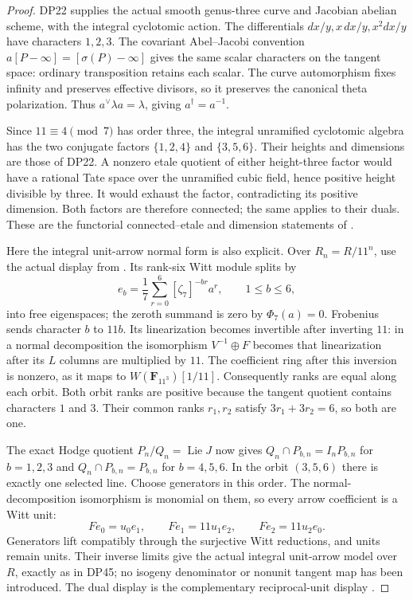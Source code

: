 \begin{proof}
DP22 supplies the actual smooth genus-three curve and Jacobian abelian scheme, with the integral cyclotomic action.
The differentials $dx/y,x\,dx/y,x^2dx/y$ have characters $1,2,3$.
The covariant Abel--Jacobi convention
$a[P-\infty]=[\sigma(P)-\infty]$ gives the same scalar characters on the tangent space: ordinary transposition retains each scalar.
The curve automorphism fixes infinity and preserves effective divisors, so it preserves the canonical theta polarization.
Thus $a^\vee\lambda a=\lambda$, giving $a^\dagger=a^{-1}$.

Since $11\equiv4\pmod7$ has order three, the integral unramified cyclotomic algebra has the two conjugate factors
$\{1,2,4\}$ and $\{3,5,6\}$.
Their heights and dimensions are those of DP22.
A nonzero etale quotient of either height-three factor would have a rational Tate space over the unramified cubic field, hence positive height divisible by three.
It would exhaust the factor, contradicting its positive dimension.
Both factors are therefore connected; the same applies to their duals.
These are the functorial connected--etale and dimension statements of
\cite[\S2.2, (4); \S2.3, Proposition 3]{Tate67}.

Here the integral unit-arrow normal form is also explicit.
Over $R_n=R/11^n$, use the actual display from
\cite[Theorems 5 and 9, pp.~131--132]{Zink}.
Its rank-six Witt module splits by
\[
 e_b=\frac17\sum_{r=0}^6[\zeta_7]^{-br}a^r,\qquad 1\le b\le6,
\]
into free eigenspaces; the zeroth summand is zero by $\Phi_7(a)=0$.
Frobenius sends character $b$ to $11b$.
Its linearization becomes invertible after inverting $11$:
in a normal decomposition the isomorphism $V^{-1}\oplus F$ becomes that linearization after its $L$ columns are multiplied by $11$.
The coefficient ring after this inversion is nonzero, as it maps to
$W(\mathbf F_{11^3})[1/11]$.
Consequently ranks are equal along each orbit.
Both orbit ranks are positive because the tangent quotient contains characters $1$ and $3$.
Their common ranks $r_1,r_2$ satisfy $3r_1+3r_2=6$, so both are one.

The exact Hodge quotient $P_n/Q_n=\operatorname{Lie}J$ now gives
$Q_n\cap P_{b,n}=I_nP_{b,n}$ for $b=1,2,3$ and
$Q_n\cap P_{b,n}=P_{b,n}$ for $b=4,5,6$.
In the orbit $(3,5,6)$ there is exactly one selected line.
Choose generators in this order.
The normal-decomposition isomorphism is monomial on them, so every arrow coefficient is a Witt unit:
\[
 Fe_0=u_0e_1,\qquad Fe_1=11u_1e_2,\qquad
 Fe_2=11u_2e_0 .
\]
Generators lift compatibly through the surjective Witt reductions, and units remain units.
Their inverse limits give the actual integral unit-arrow model over $R$, exactly as in DP45; no isogeny denominator or nonunit tangent map has been introduced.
The dual display is the complementary reciprocal-unit display
\cite[Definition 19 and (22), p.~143]{Zink}.


\end{proof}
